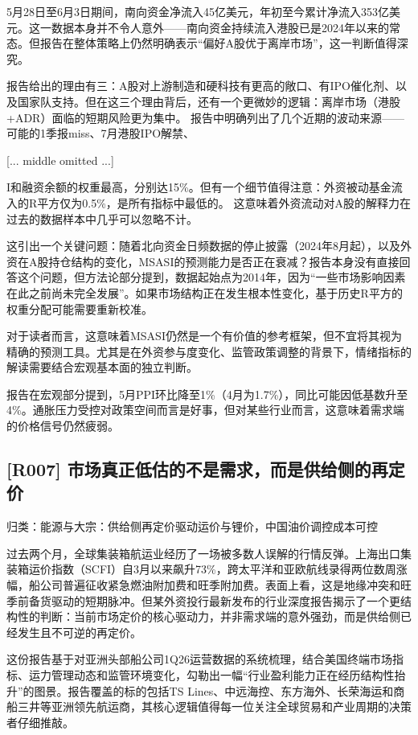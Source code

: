 \documentclass[11pt]{ctexart}
\begin{document}
5月28日至6月3日期间，南向资金净流入45亿美元，年初至今累计净流入353亿美元。这一数据本身并不令人意外——南向资金持续流入港股已是2024年以来的常态。但报告在整体策略上仍然明确表示“偏好A股优于离岸市场”，这一判断值得深究。

报告给出的理由有三：A股对上游制造和硬科技有更高的敞口、有IPO催化剂、以及国家队支持。但在这三个理由背后，还有一个更微妙的逻辑：离岸市场（港股+ADR）面临的短期风险更为集中。 报告中明确列出了几个近期的波动来源——可能的1季报miss、7月港股IPO解禁、

[... middle omitted ...]

I和融资余额的权重最高，分别达15\%。但有一个细节值得注意：外资被动基金流入的R平方仅为0.5\%，是所有指标中最低的。 这意味着外资流动对A股的解释力在过去的数据样本中几乎可以忽略不计。

这引出一个关键问题：随着北向资金日频数据的停止披露（2024年8月起），以及外资在A股持仓结构的变化，MSASI的预测能力是否正在衰减？报告本身没有直接回答这个问题，但方法论部分提到，数据起始点为2014年，因为“一些市场影响因素在此之前尚未完全发展”。如果市场结构正在发生根本性变化，基于历史R平方的权重分配可能需要重新校准。

对于读者而言，这意味着MSASI仍然是一个有价值的参考框架，但不宜将其视为精确的预测工具。尤其是在外资参与度变化、监管政策调整的背景下，情绪指标的解读需要结合宏观基本面的独立判断。

报告在宏观部分提到，5月PPI环比降至1\%（4月为1.7\%），同比可能因低基数升至4\%。通胀压力受控对政策空间而言是好事，但对某些行业而言，这意味着需求端的价格信号仍然疲弱。

\subsection{[R007] 市场真正低估的不是需求，而是供给侧的再定价}
{\small\color{refgray}归类：能源与大宗：供给侧再定价驱动运价与锂价，中国油价调控成本可控}

过去两个月，全球集装箱航运业经历了一场被多数人误解的行情反弹。上海出口集装箱运价指数（SCFI）自3月以来飙升73\%，跨太平洋和亚欧航线录得两位数周涨幅，船公司普遍征收紧急燃油附加费和旺季附加费。表面上看，这是地缘冲突和旺季前备货驱动的短期脉冲。但某外资投行最新发布的行业深度报告揭示了一个更结构性的判断：当前市场定价的核心驱动力，并非需求端的意外强劲，而是供给侧已经发生且不可逆的再定价。

这份报告基于对亚洲头部船公司1Q26运营数据的系统梳理，结合美国终端市场指标、运力管理动态和监管环境变化，勾勒出一幅“行业盈利能力正在经历结构性抬升”的图景。报告覆盖的标的包括TS Lines、中远海控、东方海外、长荣海运和商船三井等亚洲领先航运商，其核心逻辑值得每一位关注全球贸易和产业周期的决策者仔细推敲。
\end{document}
